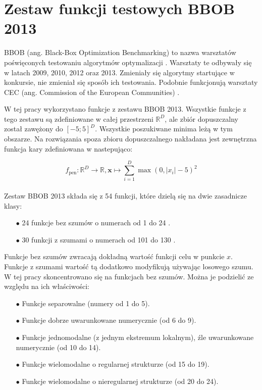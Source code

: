 \documentclass[a4paper,onecolumn,oneside,12pt,wide,floatssmall]{mwrep}
\theoremstyle{definition}
\theoremstyle{plain}%
\theoremstyle{remark}
\begin{document}
\section{Zestaw funkcji testowych BBOB 2013}
\label{sec:zestaw}

BBOB (ang. Black-Box Optimization Benchmarking) to nazwa warsztatów poświęconych testowaniu 
algorytmów optymalizacji \cite{setup}. 
Warsztaty te odbywały się w latach 2009, 2010, 2012 oraz 2013. 
Zmieniały się algorytmy startujące w konkursie, nie zmieniał
się sposób ich testowania. Podobnie funkcjonują warsztaty CEC (ang. Commission of the European Communities)
\cite{cec}.

W tej pracy wykorzystano funkcje z zestawu BBOB 2013. Wszystkie funkcje z tego zestawu
są zdefiniowane w całej przestrzeni $\mathbb{R}^D$, 
ale zbiór dopuszczalny został zawężony do $[-5; 5]^D$. 
Wszystkie poszukiwane minima leżą w tym obszarze.
Na rozwiązania spoza zbioru dopuszczalnego 
nakładana jest zewnętrzna funkcja kary zdefiniowana w \cite{setup} nastepująco: 

$$ f_\text{pen} : \mathbb{R}^D \rightarrow \mathbb{R}, 
\textbf{x} \mapsto \sum\limits_{i=1}^D \max\left(0, |x_i| - 5\right)^2 $$ 
\\
Zestaw BBOB 2013 składa się z 54 funkcji, które dzielą się na dwie zasadnicze klasy:

\begin{itemize}
 \item[$\bullet$] 24 funkcje bez szumów o numerach od 1 do 24 \cite{noiseless}. 
 \item[$\bullet$] 30 funkcji z szumami o numerach od 101 do 130 \cite{noisy}.
\end{itemize} 

Funkcje bez szumów zwracają dokładną wartość funkcji celu w punkcie $x$. Funkcje z szumami wartość tą dodatkowo modyfikują używając 
losowego szumu. W tej pracy skoncentrowano się na funkcjach bez szumów. Można je podzielić ze względu
na ich właściwości:

\begin{itemize}
 \item[$\bullet$] Funkcje separowalne (numery od 1 do 5).
 \item[$\bullet$] Funkcje dobrze uwarunkowane numerycznie (od 6 do 9).
 \item[$\bullet$] Funkcje jednomodalne (z jednym ekstremum lokalnym), źle uwarunkowane numerycznie (od 10 do 14).
 \item[$\bullet$] Funkcje wielomodalne o regularnej strukturze (od 15 do 19).
 \item[$\bullet$] Funkcje wielomodalne o nieregularnej strukturze (od 20 do 24).
\end{itemize} 
\end{document}
